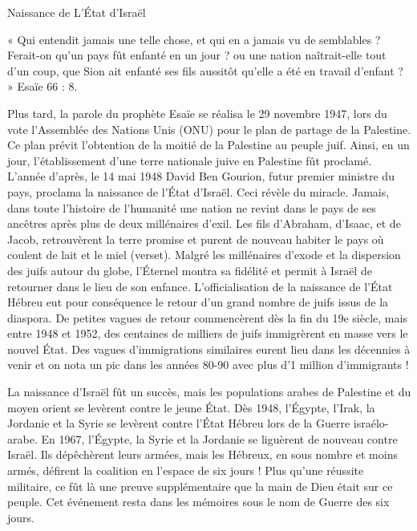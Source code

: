 Naissance de L’État d'Israël

« Qui entendit jamais une telle chose, et qui en a jamais vu de semblables ? Ferait-on qu'un pays fût enfanté en un jour ? ou une nation naîtrait-elle tout d'un coup, que Sion ait enfanté ses fils aussitôt qu'elle a été en travail d'enfant ? » Esaïe 66 : 8.

Plus tard, la parole du prophète Esaïe se réalisa le 29 novembre 1947, lors du vote l'Assemblée des Nations Unis (ONU) pour le plan de partage de la Palestine. Ce plan prévit l'obtention de la moitié de la Palestine au peuple juif. Ainsi, en un jour, l'établissement d'une terre nationale juive en Palestine fût proclamé. L'année d'après, le 14 mai 1948 David Ben Gourion, futur premier ministre du pays, proclama la naissance de l’État d'Israël. Ceci révèle du miracle. Jamais, dans toute l'histoire de l'humanité une nation ne revint dans le pays de ses ancêtres après plus de deux millénaires d'exil. Les fils d'Abraham, d'Isaac, et de Jacob, retrouvèrent la terre promise et purent de nouveau habiter le pays où coulent de lait et le miel (verset). Malgré les millénaires d'exode et la dispersion des juifs autour du globe, l’Éternel montra sa fidélité et permit à Israël de retourner dans le lieu de son enfance.
L'officialisation de la naissance de l’État Hébreu eut pour conséquence le retour d'un grand nombre de juifs issus de la diaspora. De petites vagues de retour commencèrent dès la fin du 19e siècle, mais entre 1948 et 1952, des centaines de milliers de juifs immigrèrent en masse vers le nouvel État. Des vagues d'immigrations similaires eurent lieu dans les décennies à venir et on nota un pic dans les années 80-90 avec plus d'1 million d'immigrants !

La naissance d'Israël fût un succès, mais les populations arabes de Palestine et du moyen orient se levèrent contre le jeune État. Dès 1948, l’Égypte, l'Irak, la Jordanie et la Syrie se levèrent contre l’État Hébreu lors de la Guerre israélo-arabe. En 1967, l’Égypte, la Syrie et la Jordanie se liguèrent de nouveau contre Israël. Ils dépêchèrent leurs armées, mais les Hébreux, en sous nombre et moins armés, défirent la coalition en l'espace de six jours ! Plus qu'une réussite militaire, ce fût là une preuve supplémentaire que la main de Dieu était sur ce peuple. Cet événement resta dans les mémoires sous le nom de Guerre des six jours.


